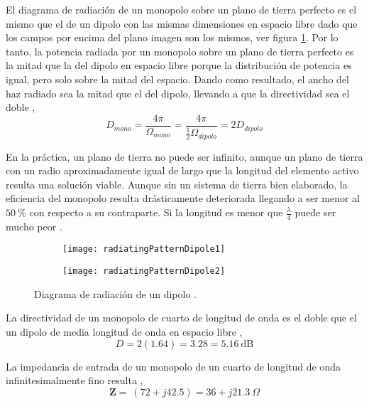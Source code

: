 El diagrama de radiación de un monopolo sobre un plano de tierra perfecto es el mismo que el de un dipolo con las mismas dimensiones en espacio libre dado que los campos por encima del plano imagen son los mismos, ver figura \ref{fig:radingPatternDipole}. Por lo tanto, la potencia radiada por un monopolo sobre un plano de tierra perfecto es la mitad que la del dipolo en espacio libre porque la distribución de potencia es igual, pero solo sobre la mitad del espacio. Dando como resultado, el ancho del haz radiado sea la mitad que el del dipolo, llevando a que la directividad sea el doble \cite{Stutzman2013},
\begin{equation}
  D_{mono} = \dfrac{4\pi}{\Omega_{mono}} = \dfrac{4\pi}{\frac{1}{2}\Omega_{dipolo}} = 2D_{dipolo}
\end{equation}

En la práctica, un plano de tierra no puede ser infinito, aunque un plano de tierra con un radio aproximadamente igual de largo que la longitud del elemento activo resulta una solución viable. Aunque sin un sistema de tierra bien elaborado, la eficiencia del monopolo resulta drásticamente deteriorada llegando a ser menor al $\SI{50}{\percent}$ con respecto a su contraparte. Si la longitud es menor que $\frac{\lambda}{4}$ puede ser mucho peor \cite{arrl2007}.

\begin{figure}
  \centering
  \begin{subfigure}[b]{0.4\textwidth}
    \texttt{[image: radiatingPatternDipole1]}
  \end{subfigure}
  \begin{subfigure}[b]{0.4\textwidth}
    \texttt{[image: radiatingPatternDipole2]}
  \end{subfigure}             
  \caption{Diagrama de radiación de un dipolo \cite{arrl2007}.}
  \label{fig:radingPatternDipole}
\end{figure}

La directividad de un monopolo de cuarto de longitud de onda es el doble que el un dipolo de media longitud de onda en espacio libre \cite{Stutzman2013},
\begin{equation}
  D = 2(\num{1.64}) = \num{3.28} = \SI{5.16}{\dB}
\end{equation}

La impedancia de entrada de un monopolo de un cuarto de longitud de onda infinitesimalmente fino resulta \cite{Stutzman2013},
\begin{equation}
  \bm{Z} = ~ (72 + j\num{42.5}) = 36 + j\SI{21.3}{\Omega}
\end{equation}


